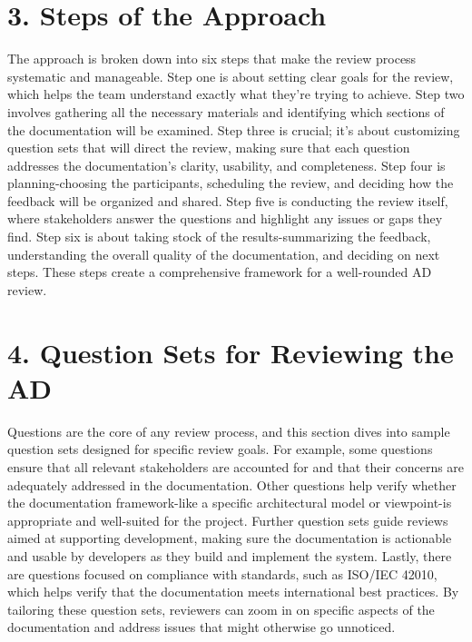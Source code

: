\documentclass{article}
\begin{document}
\section*{3. Steps of the Approach}
The approach is broken down into six steps that make the review process systematic and manageable. Step one is about setting clear goals for the review, which helps the team understand exactly what they’re trying to achieve. Step two involves gathering all the necessary materials and identifying which sections of the documentation will be examined. Step three is crucial; it’s about customizing question sets that will direct the review, making sure that each question addresses the documentation's clarity, usability, and completeness. Step four is planning-choosing the participants, scheduling the review, and deciding how the feedback will be organized and shared. Step five is conducting the review itself, where stakeholders answer the questions and highlight any issues or gaps they find. Step six is about taking stock of the results-summarizing the feedback, understanding the overall quality of the documentation, and deciding on next steps. These steps create a comprehensive framework for a well-rounded AD review.

\section*{4. Question Sets for Reviewing the AD}
Questions are the core of any review process, and this section dives into sample question sets designed for specific review goals. For example, some questions ensure that all relevant stakeholders are accounted for and that their concerns are adequately addressed in the documentation. Other questions help verify whether the documentation framework-like a specific architectural model or viewpoint-is appropriate and well-suited for the project. Further question sets guide reviews aimed at supporting development, making sure the documentation is actionable and usable by developers as they build and implement the system. Lastly, there are questions focused on compliance with standards, such as ISO/IEC 42010, which helps verify that the documentation meets international best practices. By tailoring these question sets, reviewers can zoom in on specific aspects of the documentation and address issues that might otherwise go unnoticed.
\end{document}
